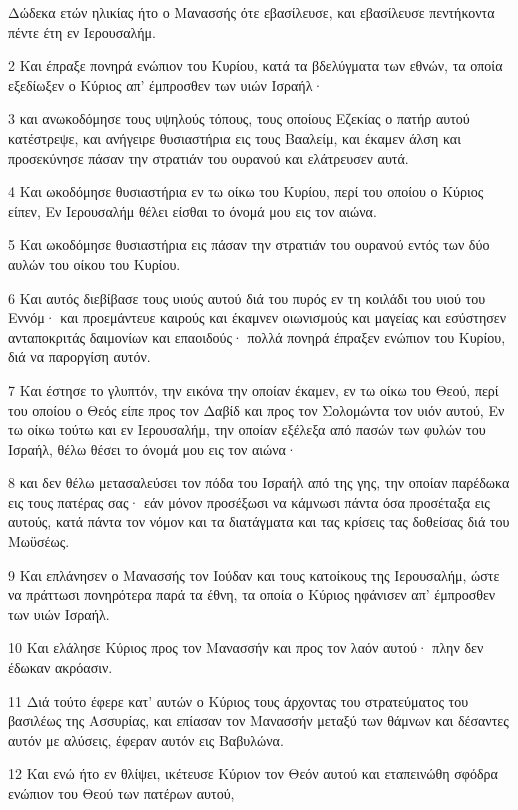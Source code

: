 \par Δώδεκα ετών ηλικίας ήτο ο Μανασσής ότε εβασίλευσε, και εβασίλευσε πεντήκοντα πέντε έτη εν Ιερουσαλήμ.
\par 2 Και έπραξε πονηρά ενώπιον του Κυρίου, κατά τα βδελύγματα των εθνών, τα οποία εξεδίωξεν ο Κύριος απ' έμπροσθεν των υιών Ισραήλ·
\par 3 και ανωκοδόμησε τους υψηλούς τόπους, τους οποίους Εζεκίας ο πατήρ αυτού κατέστρεψε, και ανήγειρε θυσιαστήρια εις τους Βααλείμ, και έκαμεν άλση και προσεκύνησε πάσαν την στρατιάν του ουρανού και ελάτρευσεν αυτά.
\par 4 Και ωκοδόμησε θυσιαστήρια εν τω οίκω του Κυρίου, περί του οποίου ο Κύριος είπεν, Εν Ιερουσαλήμ θέλει είσθαι το όνομά μου εις τον αιώνα.
\par 5 Και ωκοδόμησε θυσιαστήρια εις πάσαν την στρατιάν του ουρανού εντός των δύο αυλών του οίκου του Κυρίου.
\par 6 Και αυτός διεβίβασε τους υιούς αυτού διά του πυρός εν τη κοιλάδι του υιού του Εννόμ· και προεμάντευε καιρούς και έκαμνεν οιωνισμούς και μαγείας και εσύστησεν ανταποκριτάς δαιμονίων και επαοιδούς· πολλά πονηρά έπραξεν ενώπιον του Κυρίου, διά να παροργίση αυτόν.
\par 7 Και έστησε το γλυπτόν, την εικόνα την οποίαν έκαμεν, εν τω οίκω του Θεού, περί του οποίου ο Θεός είπε προς τον Δαβίδ και προς τον Σολομώντα τον υιόν αυτού, Εν τω οίκω τούτω και εν Ιερουσαλήμ, την οποίαν εξέλεξα από πασών των φυλών του Ισραήλ, θέλω θέσει το όνομά μου εις τον αιώνα·
\par 8 και δεν θέλω μετασαλεύσει τον πόδα του Ισραήλ από της γης, την οποίαν παρέδωκα εις τους πατέρας σας· εάν μόνον προσέξωσι να κάμνωσι πάντα όσα προσέταξα εις αυτούς, κατά πάντα τον νόμον και τα διατάγματα και τας κρίσεις τας δοθείσας διά του Μωϋσέως.
\par 9 Και επλάνησεν ο Μανασσής τον Ιούδαν και τους κατοίκους της Ιερουσαλήμ, ώστε να πράττωσι πονηρότερα παρά τα έθνη, τα οποία ο Κύριος ηφάνισεν απ' έμπροσθεν των υιών Ισραήλ.
\par 10 Και ελάλησε Κύριος προς τον Μανασσήν και προς τον λαόν αυτού· πλην δεν έδωκαν ακρόασιν.
\par 11 Διά τούτο έφερε κατ' αυτών ο Κύριος τους άρχοντας του στρατεύματος του βασιλέως της Ασσυρίας, και επίασαν τον Μανασσήν μεταξύ των θάμνων και δέσαντες αυτόν με αλύσεις, έφεραν αυτόν εις Βαβυλώνα.
\par 12 Και ενώ ήτο εν θλίψει, ικέτευσε Κύριον τον Θεόν αυτού και εταπεινώθη σφόδρα ενώπιον του Θεού των πατέρων αυτού,
